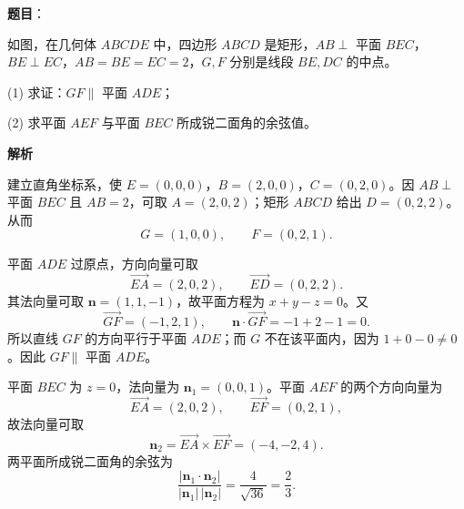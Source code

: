\begin{answer}

\textbf{题目}：

如图，在几何体 $ABCDE$ 中，四边形 $ABCD$ 是矩形，$AB\perp$ 平面 $BEC$，$BE\perp EC$，$AB=BE=EC=2$，$G,F$ 分别是线段 $BE,DC$ 的中点。

(1) 求证：$GF\parallel$ 平面 $ADE$；

(2) 求平面 $AEF$ 与平面 $BEC$ 所成锐二面角的余弦值。
\nopagebreak[4]
\begin{center}\end{center}
\nopagebreak[4]
\textbf{解析}

建立直角坐标系，使 $E=(0,0,0)$，$B=(2,0,0)$，$C=(0,2,0)$。因 $AB\perp$ 平面 $BEC$ 且 $AB=2$，可取 $A=(2,0,2)$；矩形 $ABCD$ 给出 $D=(0,2,2)$。从而
\nopagebreak[4]
\[
G=(1,0,0),\qquad F=(0,2,1).
\]


平面 $ADE$ 过原点，方向向量可取
\nopagebreak[4]
\[
\overrightarrow{EA}=(2,0,2),\qquad \overrightarrow{ED}=(0,2,2).
\]
其法向量可取 $\boldsymbol n=(1,1,-1)$，故平面方程为 $x+y-z=0$。又
\nopagebreak[4]
\[
\overrightarrow{GF}=(-1,2,1),\qquad
\boldsymbol n\cdot\overrightarrow{GF}=-1+2-1=0.
\]
所以直线 $GF$ 的方向平行于平面 $ADE$；而 $G$ 不在该平面内，因为 $1+0-0\ne0$。因此 $GF\parallel$ 平面 $ADE$。


平面 $BEC$ 为 $z=0$，法向量为 $\boldsymbol n_1=(0,0,1)$。平面 $AEF$ 的两个方向向量为
\nopagebreak[4]
\[
\overrightarrow{EA}=(2,0,2),\qquad \overrightarrow{EF}=(0,2,1),
\]
故法向量可取
\nopagebreak[4]
\[
\boldsymbol n_2=\overrightarrow{EA}\times\overrightarrow{EF}=(-4,-2,4).
\]
两平面所成锐二面角的余弦为
\nopagebreak[4]
\[
\frac{|\boldsymbol n_1\cdot\boldsymbol n_2|}
{|\boldsymbol n_1|\,|\boldsymbol n_2|}
=\frac4{\sqrt{36}}=\frac23.
\]



\end{answer}

